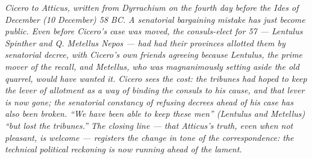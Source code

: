 
\textit{Cicero to Atticus, written from Dyrrachium on the
fourth day before the Ides of December (10 December) 58 BC.
A senatorial bargaining mistake has just become public. Even
before Cicero's case was moved, the consuls-elect for 57 ---
Lentulus Spinther and Q. Metellus Nepos --- had had their
provinces allotted them by senatorial decree, with Cicero's
own friends agreeing because Lentulus, the prime mover of the
recall, and Metellus, who was magnanimously setting aside the
old quarrel, would have wanted it. Cicero sees the cost: the
tribunes had hoped to keep the lever of allotment as a way of
binding the consuls to his cause, and that lever is now gone;
the senatorial constancy of refusing decrees ahead of his case
has also been broken. ``We have been able to keep these men''
(Lentulus and Metellus) ``but lost the tribunes.'' The closing
line --- that Atticus's truth, even when not pleasant, is
welcome --- registers the change in tone of the
correspondence: the technical political reckoning is now
running ahead of the lament.}
